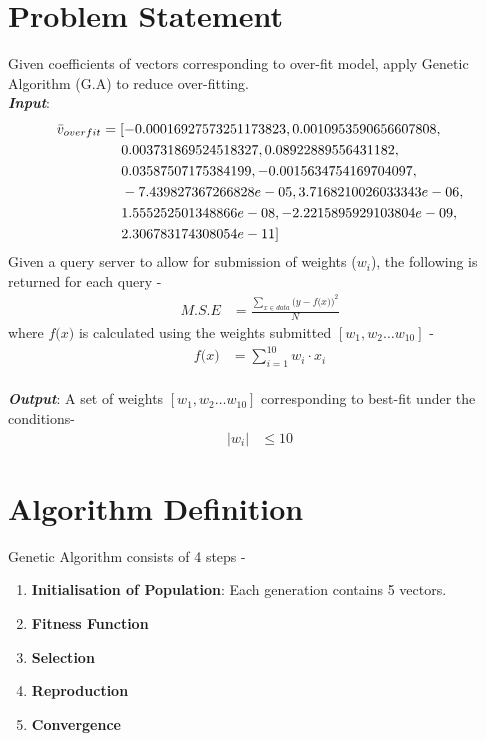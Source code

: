 \documentclass[11pt]{article}
\begin{document}
	\section{Problem Statement}
	Given coefficients of vectors corresponding to over-fit model, apply Genetic Algorithm (G.A) to reduce over-fitting. 
	\\
	\textbf{\emph{Input}}:
	\begin{align*}
		\bar{v}_{overfit}&= [-0.00016927573251173823, 0.0010953590656607808,
		\\ & \hspace{0.5cm} 0.003731869524518327, 0.08922889556431182,
		\\ & \hspace{0.5cm} 0.03587507175384199, -0.0015634754169704097,
		\\ & \hspace{0.5cm} -7.439827367266828e-05, 3.7168210026033343e-06, 
		\\ & \hspace{0.5cm} 1.555252501348866e-08, -2.2215895929103804e-09, 
		\\  & \hspace{0.5cm}2.306783174308054e-11]
	\end{align*}
	Given a query server to allow for submission of weights ($w_i$), the following is returned for each query - 
	\begin{align*}
		M.S.E &= \frac{\sum_{x\in data} \big(y - f\big(x\big)\big)^{2}}{N}
	\end{align*}
	where $f\big(x\big)$ is calculated using the weights submitted $[w_1,w_2 \ldots w_{10}]$ - 
	\begin{align*}
		f\big(x\big) &= \sum_{i=1}^{10} w_i\cdot x_i
	\end{align*}
	\\	
	\textbf{\emph{Output}}:	
	A set of weights $[w_1,w_2 \ldots w_{10}]$ corresponding to best-fit under the conditions- 
	\begin{align*}
		|w_i| &\leq 10
	\end{align*}
	\section{Algorithm Definition}
	Genetic Algorithm consists of 4 steps - 
	\begin{enumerate}
		\item \textbf{Initialisation of Population}:
		Each generation contains 5 vectors.
		\item \textbf{Fitness Function}
		\item \textbf{Selection}
		\item \textbf{Reproduction}
		\item \textbf{Convergence}
	\end{enumerate}
\end{document}

